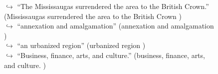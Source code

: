 \documentclass[11pt,a4paper, onecolumn]{article}
\begin{document}
\begin{figure}[t]
\begin{tcolorbox}[boxsep=0pt,left=5pt,right=0pt,top=2pt,colback = yellow!5]
\begin{dialogue}
\colorbox{pink!25}{$\hookrightarrow$}
{ ``The Mississaugas surrendered the area to the British Crown.'' (Mississaugas surrendered the area to the British Crown ) }
\\
\colorbox{pink!25}{$\hookrightarrow$}
{ ``annexation and amalgamation'' (annexation and amalgamation ) }
\\
\colorbox{pink!25}{$\hookrightarrow$}
{ ``an urbanized region'' (urbanized region ) }
\\
\colorbox{pink!25}{$\hookrightarrow$}
{ ``Business, finance, arts, and culture.'' (business, finance, arts, and culture. ) }
\\
 \end{dialogue}\end{tcolorbox}\end{figure}
\end{document}
